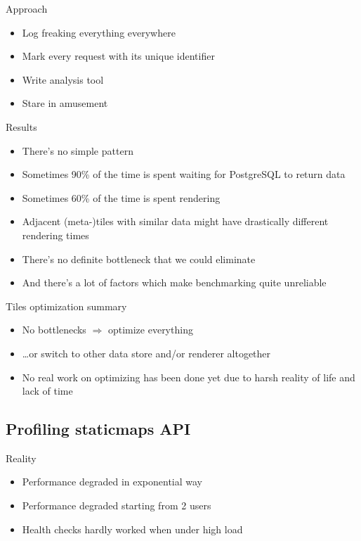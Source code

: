 \documentclass[16pt]{beamer}
\begin{document}
\begin{frame}{Approach}
  \begin{itemize}
  \item Log freaking everything everywhere
  \item Mark every request with its unique identifier
  \item Write analysis tool
  \item Stare in amusement
  \end{itemize}
\end{frame}

\begin{frame}{Results}
  \begin{itemize}
  \item There's no simple pattern
  \item Sometimes 90\% of the time is spent waiting for PostgreSQL to return data
  \item Sometimes 60\% of the time is spent rendering
  \item Adjacent (meta-)tiles with similar data might have drastically different rendering times
  \item There's no definite bottleneck that we could eliminate
  \item And there's a lot of factors which make benchmarking quite unreliable
  \end{itemize}
\end{frame}

\begin{frame}{Tiles optimization summary}
  \begin{itemize}
  \item No bottlenecks \(\Rightarrow\) optimize everything
  \item \ldots or switch to other data store and/or renderer altogether
  \item No real work on optimizing has been done yet due to harsh reality of life and lack of time
  \end{itemize}
\end{frame}

\subsection{Profiling staticmaps API}

\begin{frame}{Reality}
  \begin{itemize}
  \item Performance degraded in exponential way
  \item Performance degraded starting from 2 users
  \item Health checks hardly worked when under high load
  \end{itemize}
\end{frame}
\end{document}
